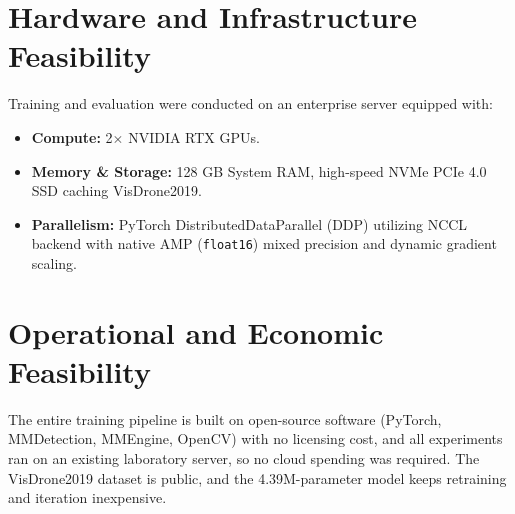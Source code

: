 \documentclass[12pt,a4paper]{report}
\begin{document}
\begin{table}[htbp]
\centering
\caption{Model Complexity, Parameter Footprint, and Computational Efficiency Comparison.}
\label{tab:complexity_comparison}
\end{table}


\section{Hardware and Infrastructure Feasibility}
Training and evaluation were conducted on an enterprise server equipped with:
\begin{itemize}[leftmargin=2em]
    \item \textbf{Compute:} 2$\times$ NVIDIA RTX GPUs.
    \item \textbf{Memory \& Storage:} 128 GB System RAM, high-speed NVMe PCIe 4.0 SSD caching VisDrone2019.
    \item \textbf{Parallelism:} PyTorch DistributedDataParallel (DDP) utilizing NCCL backend with native AMP (\texttt{float16}) mixed precision and dynamic gradient scaling.
\end{itemize}

\section{Operational and Economic Feasibility}
The entire training pipeline is built on open-source software (PyTorch, MMDetection, MMEngine, OpenCV) with no licensing cost, and all experiments ran on an existing laboratory server, so no cloud spending was required. The VisDrone2019 dataset is public, and the 4.39M-parameter model keeps retraining and iteration inexpensive.
\end{document}
